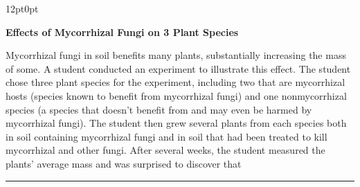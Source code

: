 \documentclass[11pt, twocolumn]{article}
\newcounter{questionnum}
\begin{document}
\vspace{6pt}\noindent
\begin{minipage}{\columnwidth}\raggedright
\noindent{}\par\vspace{8pt}
\begin{adjustwidth}{12pt}{0pt}
\begin{center}
\textbf{Effects of Mycorrhizal Fungi on 3 Plant Species}
\end{center}
\noindent{}

Mycorrhizal fungi in soil benefits many plants, substantially increasing the mass of some. A student conducted an experiment to illustrate this effect. The student chose three plant species for the experiment, including two that are mycorrhizal hosts (species known to benefit from mycorrhizal fungi) and one nonmycorrhizal species (a species that doesn't benefit from and may even be harmed by mycorrhizal fungi). The student then grew several plants from each species both in soil containing mycorrhizal fungi and in soil that had been treated to kill mycorrhizal and other fungi. After several weeks, the student measured the plants' average mass and was surprised to discover that \,\rule{2cm}{0.4pt}\,
\vspace{6pt}


\end{adjustwidth}
\end{minipage}
\end{document}
